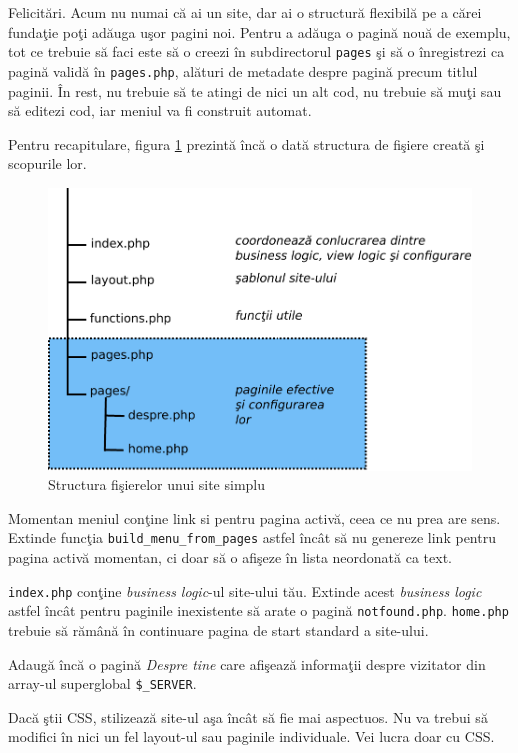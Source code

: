 Felicitări. Acum nu numai că ai un site, dar ai o structură
flexibilă pe a cărei fundaţie poţi adăuga uşor pagini noi.
Pentru a adăuga o pagină nouă de exemplu, tot ce trebuie
să faci este să o creezi în subdirectorul \texttt{pages}
şi să o înregistrezi ca pagină validă în \texttt{pages.php},
alături de metadate despre pagină precum titlul paginii.
În rest, nu trebuie să te atingi de nici un alt cod,
nu trebuie să muţi sau să editezi cod, iar meniul va fi
construit automat.

Pentru recapitulare, figura \ref{fig:filestruct-homepage}
prezintă încă o dată structura de fişiere creată
şi scopurile lor.

\begin{figure}[H]
  \centering
    \includegraphics[scale=.5]{cap03/structure-homepage-crop.pdf}
  \caption{Structura fişierelor unui site simplu}
  \label{fig:filestruct-homepage}
\end{figure}

\begin{Exercise}[title={Îmbunătăţeşte-ţi pagina personală},difficulty=1]
\ExePart
Momentan meniul conţine link  si pentru pagina activă,
ceea ce nu prea are sens. Extinde funcţia
\texttt{build\_menu\_from\_pages} astfel încât să
nu genereze link pentru pagina activă momentan, ci
doar să o afişeze în lista neordonată ca text.

\ExePart
\texttt{index.php} conţine \textit{business logic}-ul site-ului tău.
Extinde acest \textit{business logic} astfel încât pentru
paginile inexistente să arate o pagină \texttt{notfound.php}.
\texttt{home.php} trebuie să rămână în continuare pagina de
start standard a site-ului.

\ExePart
Adaugă încă o pagină \textit{Despre tine}
care afişează informaţii despre vizitator din array-ul superglobal
\texttt{\$\_SERVER}.

Dacă ştii CSS, stilizează site-ul aşa încât să fie mai aspectuos.
Nu va trebui să modifici în nici un fel layout-ul sau
paginile individuale. Vei lucra doar cu CSS.
\end{Exercise}

